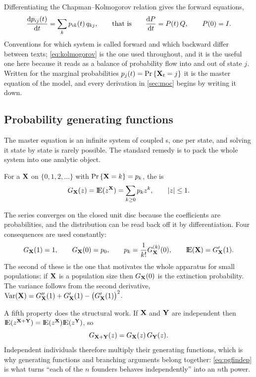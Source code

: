 Differentiating the Chapman--Kolmogorov relation gives the forward equations,
\begin{equation}
\label{eq:kolmogorov}
\displaystyle\frac{{\rm d} p_{ij}(t)}{{\rm d} t} = \sum_{k} p_{ik}(t)\,q_{kj},
\qquad\text{that is}\qquad
\displaystyle\frac{{\rm d} P}{{\rm d} t} = P(t)\,Q,
\qquad P(0)=I .
\end{equation}
Conventions for which system is called forward and which backward differ between texts;
\cref{eq:kolmogorov} is the one used throughout, and it is the useful one here because
it reads as a balance of probability flow into and out of state $j$. Written for the
marginal probabilities $p_j(t) = {\text{Pr}\left\{{{\bf X}_t}=j\right\}}$ it is the master equation of the model, and
every derivation in \cref{sec:moc} begins by writing it down.

\subsection{Probability generating functions}
\label{sec:pgf}

The master equation is an infinite system of coupled \de s, one per state, and solving
it state by state is rarely possible. The standard remedy is to pack the whole system
into one analytic object.

\begin{definition}
\label{def:pgf}
For a \rv{} ${\bf X}$ on $\{0,1,2,\dots\}$ with ${\text{Pr}\left\{{\bf X}=k\right\}}=p_k$, the \pgf{} is
\begin{equation}
\label{eq:pgfdef}
G_{{\bf X}}(z) = {\rm I}\!{\rm E}(z^{{\bf X}}) = \sum_{k\ge0}p_k z^k,
\qquad |z|\le1 .
\end{equation}
\end{definition}

\noindent
The series converges on the closed unit disc because the coefficients are probabilities,
and the distribution can be read back off it by differentiation. Four consequences are
used constantly:
\begin{equation}
\label{eq:pgfrules}
G_{{\bf X}}(1) = 1,
\qquad
G_{{\bf X}}(0) = p_0,
\qquad
p_k = \frac{1}{k!}G_{{\bf X}}^{(k)}(0),
\qquad
{\rm I}\!{\rm E}({\bf X}) = G_{{\bf X}}'(1).
\end{equation}
The second of these is the one that motivates the whole apparatus for small populations:
if ${\bf X}$ is a population size then $G_{{\bf X}}(0)$ is the extinction probability. The
variance follows from the second derivative,
$\text{Var}({\bf X}) = G_{{\bf X}}''(1)+G_{{\bf X}}'(1)-\bigl(G_{{\bf X}}'(1)\bigr)^2$.

A fifth property does the structural work. If ${\bf X}$ and ${\bf Y}$ are independent then
${\rm I}\!{\rm E}(z^{{\bf X}+{\bf Y}}) = {\rm I}\!{\rm E}(z^{{\bf X}}){\rm I}\!{\rm E}(z^{{\bf Y}})$, so
\begin{equation}
\label{eq:pgfindep}
G_{{\bf X}+{\bf Y}}(z) = G_{{\bf X}}(z)\,G_{{\bf Y}}(z).
\end{equation}
Independent individuals therefore multiply their generating functions, which is why
generating functions and branching arguments belong together: \cref{eq:pgfindep} is what
turns \enquote{each of the $n$ founders behaves independently} into an $n$th power.

